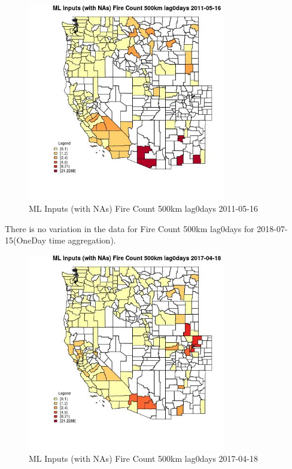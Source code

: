\begin{figure} 
\centering  
\includegraphics[width=0.77\textwidth]{Code_Outputs/Report_ML_input_PM25_Step4_part_e_de_duplicated_aves_compiled_2019-05-21wNAs_CountyFire_Count_500km_lag0daysMean2011-05-16.jpg} 
\caption{\label{fig:Report_ML_input_PM25_Step4_part_e_de_duplicated_aves_compiled_2019-05-21wNAsCountyFire_Count_500km_lag0daysMean2011-05-16}ML Inputs (with NAs) Fire Count 500km lag0days 2011-05-16} 
\end{figure} 
 

There is no variation in the data for Fire Count 500km lag0days for 2018-07-15(OneDay time aggregation). 
 

\begin{figure} 
\centering  
\includegraphics[width=0.77\textwidth]{Code_Outputs/Report_ML_input_PM25_Step4_part_e_de_duplicated_aves_compiled_2019-05-21wNAs_CountyFire_Count_500km_lag0daysMean2017-04-18.jpg} 
\caption{\label{fig:Report_ML_input_PM25_Step4_part_e_de_duplicated_aves_compiled_2019-05-21wNAsCountyFire_Count_500km_lag0daysMean2017-04-18}ML Inputs (with NAs) Fire Count 500km lag0days 2017-04-18} 
\end{figure} 
 

